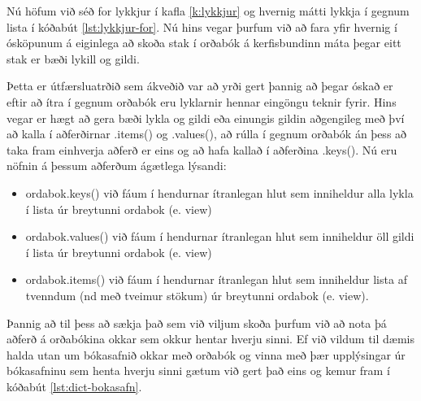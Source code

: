 Nú höfum við séð for lykkjur í kafla \ref{k:lykkjur} og hvernig mátti lykkja í gegnum lista í kóðabút \ref{lst:lykkjur-for}.
Nú hins vegar þurfum við að fara yfir hvernig í ósköpunum á eiginlega að skoða stak í orðabók á kerfisbundinn máta þegar eitt stak er bæði lykill og gildi.

Þetta er útfærsluatrðið sem ákveðið var að yrði gert þannig að þegar óskað er eftir að ítra í gegnum orðabók eru lyklarnir hennar eingöngu teknir fyrir.
Hins vegar er hægt að gera bæði lykla og gildi eða einungis gildin aðgengileg með því að kalla í aðferðirnar .items() og .values(), að rúlla í gegnum orðabók án þess að taka fram einhverja aðferð er eins og að hafa kallað í aðferðina .keys().
Nú eru nöfnin á þessum aðferðum ágætlega lýsandi:

\begin{itemize}
	\item ordabok.keys() við fáum í hendurnar ítranlegan hlut sem inniheldur alla lykla í lista úr breytunni ordabok (e. view)
	\item ordabok.values() við fáum í hendurnar ítranlegan hlut sem inniheldur öll gildi í lista úr breytunni ordabok (e. view)
	\item ordabok.items() við fáum í hendurnar ítranlegan hlut sem inniheldur lista af tvenndum (nd með tveimur stökum) úr breytunni ordabok (e. view).
\end{itemize}

Þannig að til þess að sækja það sem við viljum skoða þurfum við að nota þá aðferð á orðabókina okkar sem okkur hentar hverju sinni.
Ef við vildum til dæmis halda utan um bókasafnið okkar með orðabók og vinna með þær upplýsingar úr bókasafninu sem henta hverju sinni gætum við gert það eins og kemur fram í kóðabút \ref{lst:dict-bokasafn}.

